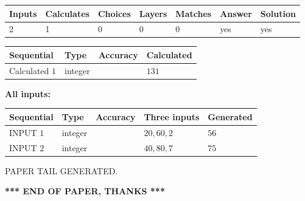 \documentclass[12pt]{article}
\begin{document}
   
   
   
\noindent\begin{tabular}{|l|l|l|l|l|l|l|}
 \hline
Inputs & Calculates & Choices & Layers & Matches & Answer & Solution \\ \hline
 2  & 
 1  & 
 0
  & 
 0  & 
 0  & 
  yes & 
  yes 
  \\ \hline
 \end{tabular}
   
   
   
   
\noindent{}
   
   
  
  
\noindent\begin{tabular}{|l|l|l|l|}
\hline
 Sequential & Type & Accuracy & Calculated \\ 
\hline
 
 
  Calculated $  1 $ & integer &  & 
  $ 131 $ 
 \\  \hline  
 \end{tabular}
   
   
   
   
\noindent\vspace{0.1in}\hspace{-0.08in} {\textbf{\Large{All inputs: }}}
   
   
  
  
\noindent\begin{tabular}{|l|l|l|l|l|}
\hline
 Sequential & Type & Accuracy & Three inputs & Generated \\ 
\hline
 
 
  INPUT $  1 $ & integer &  & $
 20
 , 
 60
 , 
 2
 $ & $ 56 $ 
 \\  \hline  
 
 
  INPUT $  2 $ & integer &  & $
 40
 , 
 80
 , 
 7
 $ & $ 75 $ 
 \\  \hline  
 \end{tabular}
   
   
   
   
   
   
 \vspace{0.2in}
 
   
   
\vspace{2.0in} PAPER TAIL GENERATED.
   
   
   
   
\vspace{1.0in} 
{\textbf{\large{ *** END OF PAPER, THANKS *** }}} 
   
\end{document}
